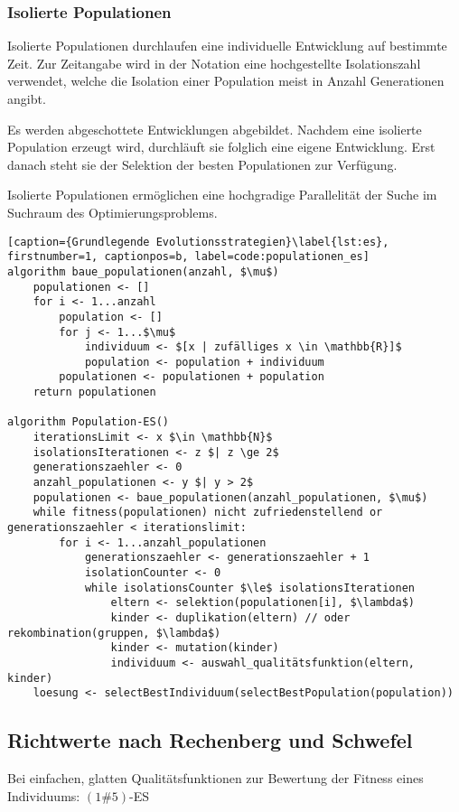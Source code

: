 \subsubsection{Isolierte Populationen}

Isolierte Populationen durchlaufen eine individuelle Entwicklung auf bestimmte Zeit.
Zur Zeitangabe wird in der Notation eine hochgestellte Isolationszahl verwendet, welche die Isolation einer Population meist in Anzahl Generationen angibt.

Es werden abgeschottete Entwicklungen abgebildet.
Nachdem eine isolierte Population erzeugt wird, durchläuft sie folglich eine eigene Entwicklung.
Erst danach steht sie der Selektion der besten Populationen zur Verfügung.

Isolierte Populationen ermöglichen eine hochgradige Parallelität der Suche im Suchraum des Optimierungsproblems.

\begin{lstlisting}[caption={Grundlegende Evolutionsstrategien}\label{lst:es}, firstnumber=1, captionpos=b, label=code:populationen_es]
algorithm baue_populationen(anzahl, $\mu$)
	populationen <- []
	for i <- 1...anzahl
		population <- []	
		for j <- 1...$\mu$
			individuum <- $[x | zufälliges x \in \mathbb{R}]$
			population <- population + individuum
		populationen <- populationen + population
	return populationen

algorithm Population-ES()
	iterationsLimit <- x $\in \mathbb{N}$
	isolationsIterationen <- z $| z \ge 2$
	generationszaehler <- 0
	anzahl_populationen <- y $| y > 2$
	populationen <- baue_populationen(anzahl_populationen, $\mu$)
	while fitness(populationen) nicht zufriedenstellend or generationszaehler < iterationslimit:
		for i <- 1...anzahl_populationen
			generationszaehler <- generationszaehler + 1
			isolationCounter <- 0			
			while isolationsCounter $\le$ isolationsIterationen
				eltern <- selektion(populationen[i], $\lambda$)
				kinder <- duplikation(eltern) // oder rekombination(gruppen, $\lambda$)
				kinder <- mutation(kinder)
				individuum <- auswahl_qualitätsfunktion(eltern, kinder)
	loesung <- selectBestIndividuum(selectBestPopulation(population))
\end{lstlisting}


\subsection{Richtwerte nach Rechenberg und Schwefel}

Bei einfachen, glatten Qualitätsfunktionen zur Bewertung der Fitness eines Individuums: $(1\#5)$-ES

